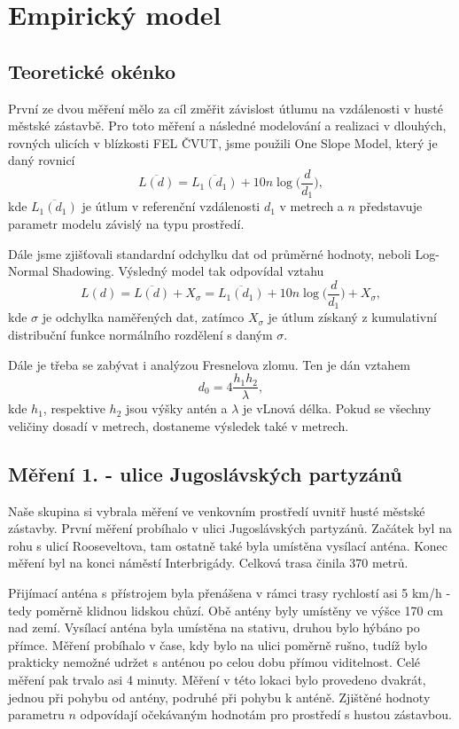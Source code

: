 \chapter{Empirický model}
\section{Teoretické okénko}

První ze dvou měření mělo za cíl změřit závislost útlumu na vzdálenosti v husté městské zástavbě. Pro toto měření a následné modelování a realizaci v dlouhých, rovných ulicích v blízkosti FEL ČVUT, jsme použili One Slope Model, který je daný rovnicí 
\begin{equation}
    \overline{L(d)} = \overline{L_1(d_1)} + 10 n \log \big ( \frac{d}{d_1}\big),
\end{equation}
kde $\overline{L_1(d_1)}$ je útlum v referenční vzdálenosti $d_1$ v metrech a $n$ představuje parametr modelu závislý na typu prostředí.

Dále jsme zjišťovali standardní odchylku dat od průměrné hodnoty, neboli Log-Normal Shadowing. Výsledný model tak odpovídal vztahu 
\begin{equation}
    L(d) = \overline{L(d)} + X_\sigma = \overline{L_1(d_1)} + 10 n \log \big ( \frac{d}{d_1}\big) + X_\sigma,
\end{equation}
kde $\sigma$ je odchylka naměřených dat, zatímco $X_\sigma$ je útlum získaný z kumulativní distribuční funkce normálního rozdělení s daným $\sigma$.

Dále je třeba se zabývat i analýzou Fresnelova zlomu. Ten je dán vztahem
\begin{equation}
    d_0 = 4\frac{h_1 h_2}{\lambda},
\end{equation}
kde $h_1$, respektive $h_2$ jsou výšky antén a $\lambda$ je vLnová délka. Pokud se všechny veličiny dosadí v metrech, dostaneme výsledek také v metrech.

\section{Měření 1. - ulice Jugoslávských partyzánů}
Naše skupina si vybrala měření ve venkovním prostředí uvnitř husté městské zástavby. První měření probíhalo v ulici Jugoslávských partyzánů. Začátek byl na rohu s ulicí Rooseveltova, tam ostatně také byla umístěna vysílací anténa. Konec měření byl na konci náměstí Interbrigády. Celková trasa činila 370 metrů. 

Přijímací anténa s přístrojem byla přenášena v rámci trasy rychlostí asi 5 km/h -tedy poměrně klidnou lidskou chůzí. Obě antény byly umístěny ve výšce 170 cm nad zemí. Vysílací anténa byla umístěna na stativu, druhou bylo hýbáno po přímce.  Měření probíhalo v čase, kdy bylo na ulici poměrně rušno, tudíž bylo prakticky nemožné udržet s anténou po celou dobu přímou viditelnost. Celé měření pak trvalo asi 4 minuty.
Měření v této lokaci bylo provedeno dvakrát, jednou při pohybu od antény, podruhé při pohybu k anténě. Zjištěné hodnoty parametru $n$ odpovídají očekávaným hodnotám pro prostředí s hustou zástavbou.


